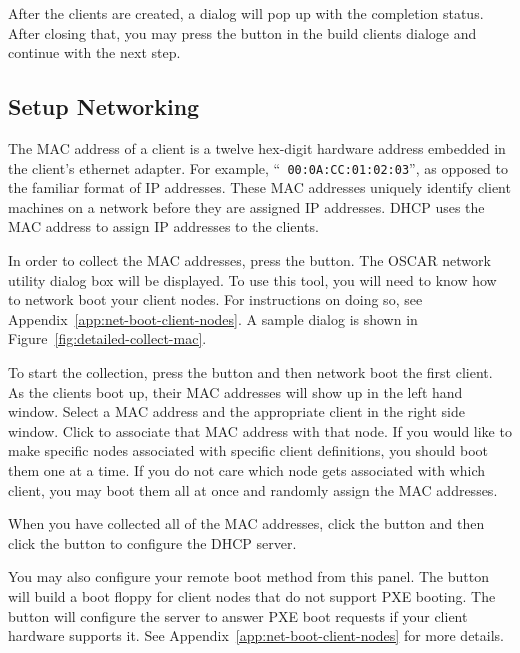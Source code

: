After the clients are created, a dialog will pop up with the
completion status. After closing that, you may press the
 button in the build clients dialoge and continue with
the next step.


\subsection{Setup Networking}
\label{det:setup-networking}

The MAC address of a client is a twelve hex-digit hardware address
embedded in the client's ethernet adapter. For example, ``{\tt
  00:0A:CC:01:02:03}'', as opposed to the familiar format of IP
addresses.  These MAC addresses uniquely identify client machines on a
network before they are assigned IP addresses. DHCP uses the MAC
address to assign IP addresses to the clients.

In order to collect the MAC addresses, press the  button. The OSCAR network utility dialog box will be
displayed.  To use this tool, you will need to know how to network
boot your client nodes.  For instructions on doing so, see
Appendix~\ref{app:net-boot-client-nodes}. A sample dialog is shown in
Figure~\ref{fig:detailed-collect-mac}.

To start the collection, press the  button
and then network boot the first client.  As the clients boot up, their
MAC addresses will show up in the left hand window. Select a MAC
address and the appropriate client in the right side window. Click
 to associate that MAC address with that
node. If you would like to make specific nodes associated with
specific client definitions, you should boot them one at a time. If
you do not care which node gets associated with which client, you may
boot them all at once and randomly assign the MAC addresses.

When you have collected all of the MAC addresses, click the
 button and then click the  button to configure the DHCP server.
 
You may also configure your remote boot method from this panel. The
 button will build a boot floppy for
client nodes that do not support PXE booting. The  button will configure the server to answer PXE boot
requests if your client hardware supports it. See
Appendix~\ref{app:net-boot-client-nodes} for more details.  

